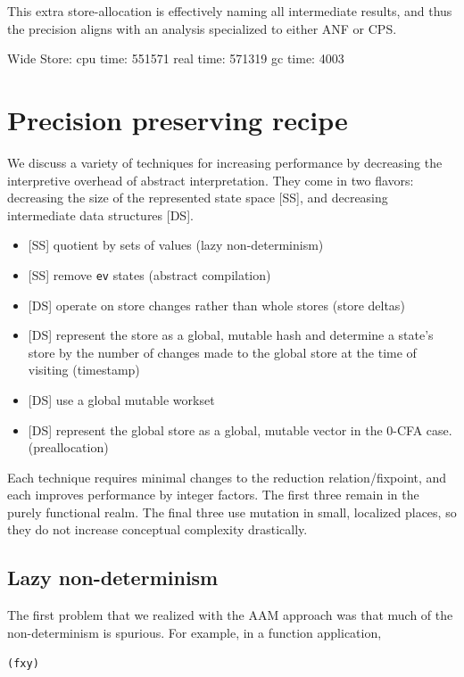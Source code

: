 \documentclass[preprint,onecolumn,9pt]{sigplanconf} %
\begin{document}
This extra store-allocation is effectively naming all intermediate
results, and thus the precision aligns with an analysis specialized to
either ANF or CPS.

Wide Store: cpu time: 551571 real time: 571319 gc time: 4003

\section{Precision preserving recipe}
\label{sec:opt}

We discuss a variety of techniques for increasing performance by
decreasing the interpretive overhead of abstract interpretation. They
come in two flavors: decreasing the size of the represented state
space [SS], and decreasing intermediate data structures [DS].

\begin{itemize}
 \item{[SS] quotient by sets of values (lazy non-determinism)}
 \item{[SS] remove {\tt ev} states (abstract compilation)}
 \item{[DS] operate on store changes rather than whole stores (store deltas)}
 \item{[DS] represent the store as a global, mutable hash and
   determine a state's store by the number of changes made to the
   global store at the time of visiting (timestamp)}
 \item{[DS] use a global mutable workset}
 \item{[DS] represent the global store as a global, mutable vector in
   the 0-CFA case. (preallocation)}
\end{itemize}
Each technique requires minimal changes to the reduction
relation/fixpoint, and each improves performance by integer
factors. The first three remain in the purely functional realm. The
final three use mutation in small, localized places, so they do not
increase conceptual complexity drastically.

\subsection{Lazy non-determinism}

The first problem that we realized with the AAM approach was that much
of the non-determinism is spurious. For example, in a function
application,
\begin{alltt}
(f x y)
\end{alltt}
\end{document}
